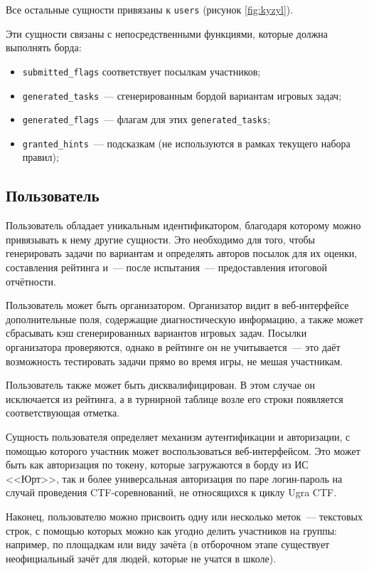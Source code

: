 Все остальные сущности привязаны к \texttt{users} (рисунок \ref{fig:kyzyl}).

Эти сущности связаны с непосредственными функциями, которые должна выполнять борда:
\begin{itemize}
\item \texttt{submitted\_flags} соответствует посылкам участников;
\item \texttt{generated\_tasks}~--- сгенерированным бордой вариантам игровых задач;
\item \texttt{generated\_flags}~--- флагам для этих \texttt{generated\_tasks};
\item \texttt{granted\_hints}~--- подсказкам (не используются в рамках текущего набора правил);
\end{itemize}



\subsection{Пользователь}

Пользователь обладает уникальным идентификатором, благодаря которому можно привязывать к нему другие сущности. Это необходимо для того, чтобы генерировать задачи по вариантам и определять авторов посылок для их оценки, составления рейтинга и~--- после испытания~--- предоставления итоговой отчётности.

Пользователь может быть организатором. Организатор видит в веб-интерфейсе дополнительные поля, содержащие диагностическую информацию, а также может сбрасывать кэш сгенерированных вариантов игровых задач. Посылки организатора проверяются, однако в рейтинге он не учитывается~--- это даёт возможность тестировать задачи прямо во время игры, не мешая участникам.

Пользователь также может быть дисквалифицирован. В этом случае он исключается из рейтинга, а в турнирной таблице возле его строки появляется соответствующая отметка.

Сущность пользователя определяет механизм аутентификации и авторизации, с помощью которого участник может воспользоваться веб-интерфейсом. Это может быть как авторизация по токену, которые загружаются в борду из ИС <<Юрт>>, так и более универсальная авторизация по паре логин-пароль на случай проведения CTF-соревнований, не относящихся к циклу Ugra CTF.

Наконец, пользователю можно присвоить одну или несколько меток~--- текстовых строк, с помощью которых можно как угодно делить участников на группы: например, по площадкам или виду зачёта (в отборочном этапе существует неофициальный зачёт для людей, которые не учатся в школе).

